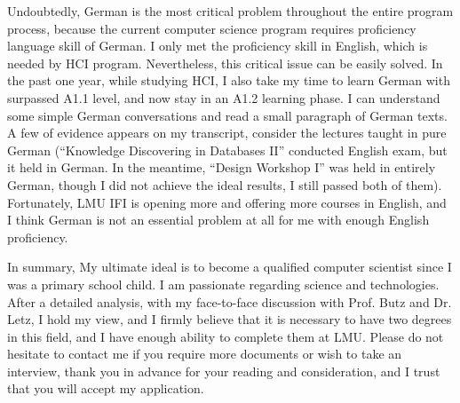 \documentclass[11pt,a4paper,sans]{moderncv}        %
\begin{document}
Undoubtedly, German is the most critical problem throughout the entire program process, because the current computer science program requires proficiency language skill of German. I only met the proficiency skill in English, which is needed by HCI program. Nevertheless, this critical issue can be easily solved. In the past one year, while studying HCI, I also take my time to learn German with surpassed A1.1 level, and now stay in an A1.2 learning phase. I can understand some simple German conversations and read a small paragraph of German texts. A few of evidence appears on my transcript, consider the lectures taught in pure German (``Knowledge Discovering in Databases II'' conducted English exam, but it held in German. In the meantime, ``Design Workshop I'' was held in entirely German, though I did not achieve the ideal results, I still passed both of them). Fortunately, LMU IFI is opening more and offering more courses in English, and I think German is not an essential problem at all for me with enough English proficiency.

\vspace{5mm}

In summary, My ultimate ideal is to become a qualified computer scientist since I was a primary school child. I am passionate regarding science and technologies. After a detailed analysis, with my face-to-face discussion with Prof. Butz and Dr. Letz, I hold my view, and I firmly believe that it is necessary to have two degrees in this field, and I have enough ability to complete them at LMU. Please do not hesitate to contact me if you require more documents or wish to take an interview, thank you in advance for your reading and consideration, and I trust that you will accept my application.

\makeletterclosing
\end{document}

